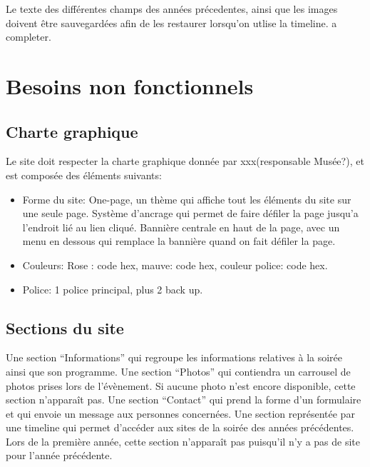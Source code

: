 \documentclass[12pt]{article}
\begin{document}
Le texte des différentes champs des années précedentes, ainsi que les images doivent être sauvegardées afin de les restaurer lorsqu'on utlise la timeline. a completer.


\section{Besoins non fonctionnels}

\subsection*{Charte graphique}

Le site doit respecter la charte graphique donnée par xxx(responsable Musée?), et est composée des éléments suivants:
\begin{itemize}
  \item Forme du site: One-page, un thème qui affiche tout les éléments du site sur une seule page. Système d'ancrage qui permet de faire défiler la page jusqu'a l'endroit lié au lien cliqué. Bannière centrale en haut de la page, avec un menu en dessous qui remplace la bannière quand on fait défiler la page.
  \item Couleurs: Rose : code hex, mauve: code hex, couleur police: code hex.
  \item Police: 1 police principal, plus 2 back up.
\end{itemize}

\subsection*{Sections du site}

 Une section “Informations” qui regroupe les informations relatives à la soirée ainsi que son programme. Une section “Photos” qui contiendra un carrousel de photos prises lors de l’évènement. Si aucune photo n’est encore disponible, cette section n'apparaît pas. Une section “Contact” qui prend la forme d’un formulaire et qui envoie un message aux personnes concernées. Une section représentée par une timeline qui permet d’accéder aux sites de la soirée des années précédentes. Lors de la première année, cette section n'apparaît pas puisqu'il n’y a pas de site pour l’année précédente.
\end{document}
